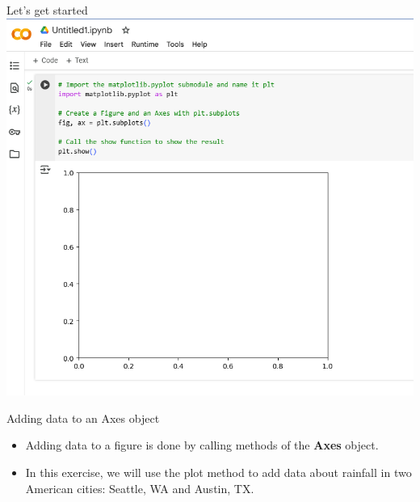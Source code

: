 \documentclass[
  ignorenonframetext,
]{beamer}
\providecommand{\tightlist}{%
  \setlength{\itemsep}{0pt}\setlength{\parskip}{0pt}}
\begin{document}
\begin{frame}{Let's get started}
\label{lets-get-started-2}
\includegraphics{../images/im224}
\end{frame}

\begin{frame}{Adding data to an Axes object}
\label{adding-data-to-an-axes-object}
\begin{itemize}
\tightlist
\item
  Adding data to a figure is done by calling methods of the
  \textbf{Axes} object.
\item
  In this exercise, we will use the plot method to add data about
  rainfall in two American cities: Seattle, WA and Austin, TX.
\end{itemize}
\end{frame}
\end{document}
